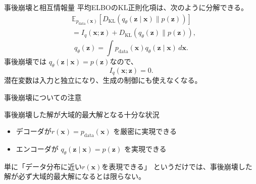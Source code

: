 \begin{frame}{事後崩壊と相互情報量}
    \small
    平均ELBOのKL正則化項は、次のように分解できる。
    \begin{align*}
        &\mathbb{E}_{p_{\mathrm{data}}(\boldsymbol{x})}
        \left[
        D_{\mathrm{KL}}\!\left(
        q_\theta(\boldsymbol{z}\mid\boldsymbol{x})\|p(\boldsymbol{z})
        \right)
        \right]\\
        &=
        I_q(\boldsymbol{x};\boldsymbol{z})
        +
        D_{\mathrm{KL}}\!\left(q_\theta(\boldsymbol{z})\|p(\boldsymbol{z})\right),
    \end{align*}
    \[
        q_\theta(\boldsymbol{z})
        =
        \int p_{\mathrm{data}}(\boldsymbol{x})
        q_\theta(\boldsymbol{z}\mid\boldsymbol{x})\,d\boldsymbol{x}.
    \]
    事後崩壊では
    $q_\theta(\boldsymbol{z}\mid\boldsymbol{x})=p(\boldsymbol{z})$なので、
    \[
        I_q(\boldsymbol{x};\boldsymbol{z})=0.
    \]
    潜在変数は入力と独立になり、生成の制御にも使えなくなる。
\end{frame}
\begin{frame}{事後崩壊についての注意}
    \begin{block}{事後崩壊した解が大域的最大解となる十分な状況}
        \begin{itemize}
            \item デコーダが$r(\boldsymbol{x})=p_{\mathrm{data}}(\boldsymbol{x})$
            を厳密に実現できる
            \item エンコーダが
            $q_\theta(\boldsymbol{z}\mid\boldsymbol{x})=p(\boldsymbol{z})$
            を実現できる
        \end{itemize}
    \end{block}
    単に「データ分布に近い$r(\boldsymbol{x})$を表現できる」
    というだけでは、事後崩壊した解が必ず大域的最大解になるとは限らない。
\end{frame}
